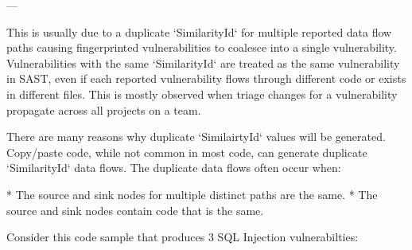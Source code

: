 ---


This is usually due to a duplicate `SimilarityId` for multiple reported data flow paths causing fingerprinted vulnerabilities to coalesce into a single vulnerability.  Vulnerabilities with the same `SimilarityId` are treated as the same vulnerability in SAST, even if each reported vulnerability flows through different code or exists in different files.  This is mostly observed when triage changes for a vulnerability propagate across all projects on a team.

There are many reasons why duplicate `SimilairtyId` values will be generated. Copy/paste code, while not common in most code, can generate duplicate `SimilarityId` data flows.  The duplicate data flows often occur when:

* The source and sink nodes for multiple distinct paths are the same.
* The source and sink nodes contain code that is the same.




Consider this code sample that produces 3 SQL Injection vulnerabilties:

